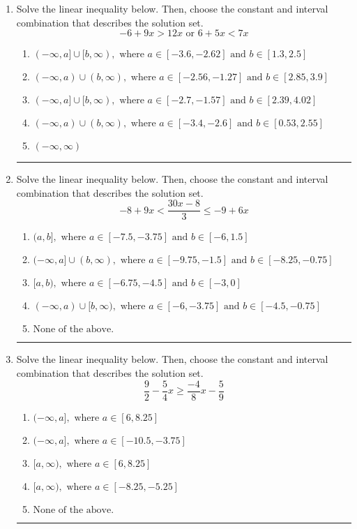 \documentclass[14pt]{extbook}
\newcommand{\litem}[1]{\item#1\hspace*{-1cm}\rule{\textwidth}{0.4pt}}
\begin{document}
\begin{enumerate}
{\begin{enumerate}[label=\Alph*.]
\end{enumerate} }
\litem{
Solve the linear inequality below. Then, choose the constant and interval combination that describes the solution set.\[ -6 + 9 x > 12 x \text{ or } 6 + 5 x < 7 x \]\begin{enumerate}[label=\Alph*.]
\item \( (-\infty, a] \cup [b, \infty), \text{ where } a \in [-3.6, -2.62] \text{ and } b \in [1.3, 2.5] \)
\item \( (-\infty, a) \cup (b, \infty), \text{ where } a \in [-2.56, -1.27] \text{ and } b \in [2.85, 3.9] \)
\item \( (-\infty, a] \cup [b, \infty), \text{ where } a \in [-2.7, -1.57] \text{ and } b \in [2.39, 4.02] \)
\item \( (-\infty, a) \cup (b, \infty), \text{ where } a \in [-3.4, -2.6] \text{ and } b \in [0.53, 2.55] \)
\item \( (-\infty, \infty) \)

\end{enumerate} }
\litem{
Solve the linear inequality below. Then, choose the constant and interval combination that describes the solution set.\[ -8 + 9 x < \frac{30 x - 8}{3} \leq -9 + 6 x \]\begin{enumerate}[label=\Alph*.]
\item \( (a, b], \text{ where } a \in [-7.5, -3.75] \text{ and } b \in [-6, 1.5] \)
\item \( (-\infty, a] \cup (b, \infty), \text{ where } a \in [-9.75, -1.5] \text{ and } b \in [-8.25, -0.75] \)
\item \( [a, b), \text{ where } a \in [-6.75, -4.5] \text{ and } b \in [-3, 0] \)
\item \( (-\infty, a) \cup [b, \infty), \text{ where } a \in [-6, -3.75] \text{ and } b \in [-4.5, -0.75] \)
\item \( \text{None of the above.} \)

\end{enumerate} }
\litem{
Solve the linear inequality below. Then, choose the constant and interval combination that describes the solution set.\[ \frac{9}{2} - \frac{5}{4} x \geq \frac{-4}{8} x - \frac{5}{9} \]\begin{enumerate}[label=\Alph*.]
\item \( (-\infty, a], \text{ where } a \in [6, 8.25] \)
\item \( (-\infty, a], \text{ where } a \in [-10.5, -3.75] \)
\item \( [a, \infty), \text{ where } a \in [6, 8.25] \)
\item \( [a, \infty), \text{ where } a \in [-8.25, -5.25] \)
\item \( \text{None of the above}. \)


\end{enumerate}}
\end{enumerate}
\end{document}
